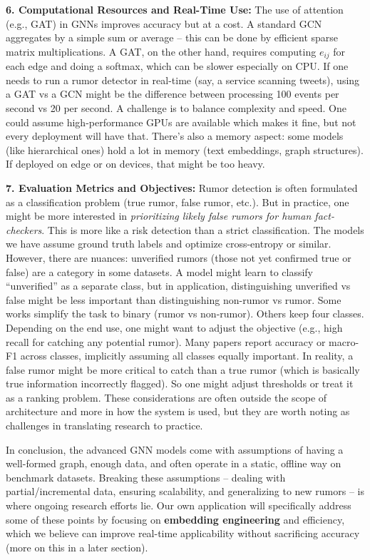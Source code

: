 \documentclass[12pt,a4paper]{report}
\begin{document}
\textbf{6. Computational Resources and Real-Time Use:} The use of attention (e.g., GAT) in GNNs improves accuracy but at a cost. A standard GCN aggregates by a simple sum or average – this can be done by efficient sparse matrix multiplications. A GAT, on the other hand, requires computing \(e_{ij}\) for each edge and doing a softmax, which can be slower especially on CPU. If one needs to run a rumor detector in real-time (say, a service scanning tweets), using a GAT vs a GCN might be the difference between processing 100 events per second vs 20 per second. A challenge is to balance complexity and speed. One could assume high-performance GPUs are available which makes it fine, but not every deployment will have that. There’s also a memory aspect: some models (like hierarchical ones) hold a lot in memory (text embeddings, graph structures). If deployed on edge or on devices, that might be too heavy.

\textbf{7. Evaluation Metrics and Objectives:} Rumor detection is often formulated as a classification problem (true rumor, false rumor, etc.). But in practice, one might be more interested in \textit{prioritizing likely false rumors for human fact-checkers}. This is more like a risk detection than a strict classification. The models we have assume ground truth labels and optimize cross-entropy or similar. However, there are nuances: unverified rumors (those not yet confirmed true or false) are a category in some datasets. A model might learn to classify “unverified” as a separate class, but in application, distinguishing unverified vs false might be less important than distinguishing non-rumor vs rumor. Some works simplify the task to binary (rumor vs non-rumor). Others keep four classes. Depending on the end use, one might want to adjust the objective (e.g., high recall for catching any potential rumor). Many papers report accuracy or macro-F1 across classes, implicitly assuming all classes equally important. In reality, a false rumor might be more critical to catch than a true rumor (which is basically true information incorrectly flagged). So one might adjust thresholds or treat it as a ranking problem. These considerations are often outside the scope of architecture and more in how the system is used, but they are worth noting as challenges in translating research to practice.

In conclusion, the advanced GNN models come with assumptions of having a well-formed graph, enough data, and often operate in a static, offline way on benchmark datasets. Breaking these assumptions – dealing with partial/incremental data, ensuring scalability, and generalizing to new rumors – is where ongoing research efforts lie. Our own application will specifically address some of these points by focusing on \textbf{embedding engineering} and efficiency, which we believe can improve real-time applicability without sacrificing accuracy (more on this in a later section).
\end{document}
